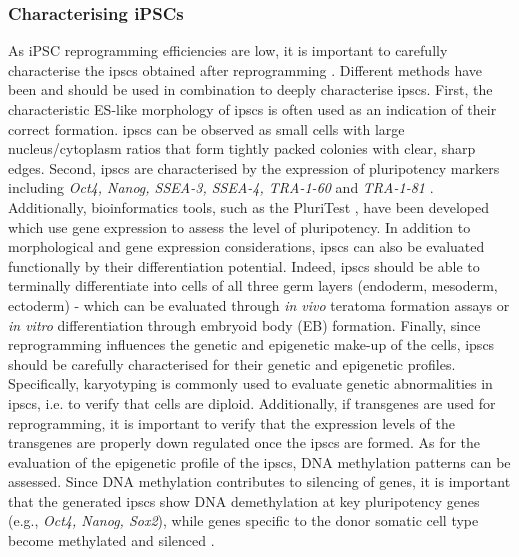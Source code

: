 \subsubsection{Characterising iPSCs}
\label{sec:ipsc_characterise}

As iPSC reprogramming efficiencies are low, it is important to carefully characterise the \glspl{ipsc} obtained after reprogramming \cite{brouwer2016choices}.
Different methods have been and should be used in combination to deeply characterise \glspl{ipsc}. 
First, the characteristic ES-like morphology of \glspl{ipsc} is often used as an indication of their correct formation. 
\glspl{ipsc} can be observed as small cells with large nucleus/cytoplasm ratios that form tightly packed colonies with clear, sharp edges. 
Second, \glspl{ipsc} are characterised by the expression of pluripotency markers including \textit{Oct4, Nanog, SSEA-3, SSEA-4, TRA-1-60} and \textit{TRA-1-81} \cite{boulting2011functionally}.
Additionally, bioinformatics tools, such as the PluriTest \cite{muller2011bioinformatic}, have been developed which use gene expression to assess the level of pluripotency. 
In addition to morphological and gene expression considerations, \glspl{ipsc} can also be evaluated functionally by their differentiation potential.
Indeed, \glspl{ipsc} should be able to terminally differentiate into cells of all three germ layers (endoderm, mesoderm, ectoderm) - which can be evaluated through \textit{in vivo} teratoma formation assays or \textit{in vitro} differentiation through embryoid body (EB) formation.
Finally, since reprogramming influences the genetic and epigenetic make-up of the cells, \glspl{ipsc} should be carefully characterised for their genetic and epigenetic profiles.
Specifically, karyotyping is commonly used to evaluate genetic abnormalities in \glspl{ipsc}, i.e. to verify that cells are diploid. 
Additionally, if transgenes are used for reprogramming, it is important to verify that the expression levels of the transgenes are properly down regulated once the \glspl{ipsc} are formed. 
As for the evaluation of the epigenetic profile of the \glspl{ipsc}, DNA methylation patterns can be assessed. 
Since DNA methylation contributes to silencing of genes, it is important that the generated \glspl{ipsc} show DNA demethylation at key pluripotency genes (e.g., \textit{Oct4, Nanog, Sox2}), while genes specific to the donor somatic cell type become methylated and silenced \cite{brouwer2016choices, omole2018ten}. 

